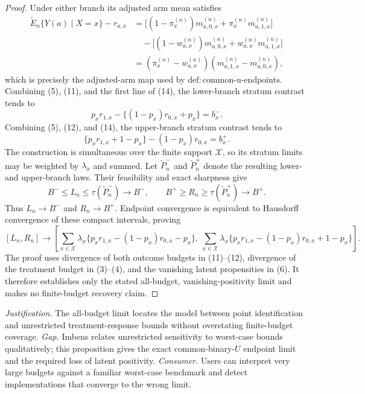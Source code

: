 \documentclass{article}
\begin{document}
\begin{proof}
Under either branch its adjusted arm mean satisfies
\[
\begin{aligned}
 \widetilde E_n\{Y(a)\mid X=x\}-r_{a,x}
 &=\bigl[(1-\pi_x^{(n)})m_{a,0,x}^{(n)}
          +\pi_x^{(n)}m_{a,1,x}^{(n)}\bigr]\\
 &\quad-\bigl[(1-w_{a,x}^{(n)})m_{a,0,x}^{(n)}
          +w_{a,x}^{(n)}m_{a,1,x}^{(n)}\bigr]\\
 &=(\pi_x^{(n)}-w_{a,x}^{(n)})
   (m_{a,1,x}^{(n)}-m_{a,0,x}^{(n)}),
\end{aligned}
\tag{14}
\]
which is precisely the adjusted-arm map used by \(\mathrm{def{:}common\text{-}u\text{-}endpoints}\).  Combining (5), (11), and the first line of (14), the lower-branch stratum contrast tends to
\[
 p_xr_{1,x}-\{(1-p_x)r_{0,x}+p_x\}=b_x^-.
 \tag{15}
\]
Combining (5), (12), and (14), the upper-branch stratum contrast tends to
\[
 \{p_xr_{1,x}+1-p_x\}-(1-p_x)r_{0,x}=b_x^+.
 \tag{16}
\]
The construction is simultaneous over the finite support \(\mathcal X\), so its stratum limits may be weighted by \(\lambda_x\) and summed.  Let \(\widetilde P_n^-\) and \(\widetilde P_n^+\) denote the resulting lower- and upper-branch laws.  Their feasibility and exact sharpness give
\[
 B^-\leq L_n\leq\tau(\widetilde P_n^- )\longrightarrow B^-,
 \qquad
 B^+\geq R_n\geq\tau(\widetilde P_n^+ )\longrightarrow B^+.
\]
Thus \(L_n\to B^-\) and \(R_n\to B^+\).  Endpoint convergence is equivalent to Hausdorff convergence of these compact intervals, proving
\[
 [L_n,R_n]\longrightarrow
 \left[
 \sum_{x\in\mathcal X}\lambda_x\{p_xr_{1,x}-(1-p_x)r_{0,x}-p_x\},
 \ \sum_{x\in\mathcal X}\lambda_x\{p_xr_{1,x}-(1-p_x)r_{0,x}+1-p_x\}
 \right].
\]
The proof uses divergence of both outcome budgets in (11)--(12), divergence of the treatment budget in (3)--(4), and the vanishing latent propensities in (6).  It therefore establishes only the stated all-budget, vanishing-positivity limit and makes no finite-budget recovery claim.
\end{proof}
\par\smallskip\noindent \textit{Justification.} The all-budget limit locates the model between point identification and unrestricted treatment-response bounds without overstating finite-budget coverage. \textit{Gap.} Imbens relates unrestricted sensitivity to worst-case bounds qualitatively; this proposition gives the exact common-binary-\(U\) endpoint limit and the required loss of latent positivity. \textit{Consumer.} Users can interpret very large budgets against a familiar worst-case benchmark and detect implementations that converge to the wrong limit.
\end{document}
